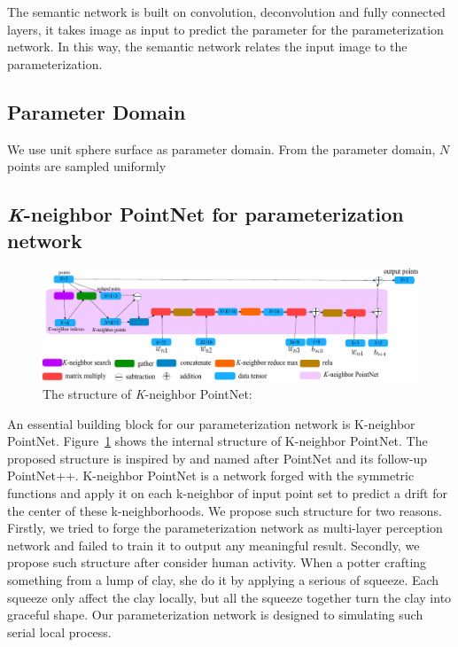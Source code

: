 The semantic network is built on convolution, deconvolution and fully connected layers, it takes image as input to predict the parameter for the parameterization network. In this way, the semantic network relates the input image to the parameterization.
\subsection{Parameter Domain}
We use unit sphere surface as parameter domain. From the parameter domain, $N$ points are sampled uniformly 
\subsection{\textit{K}-neighbor PointNet for parameterization network} 
\label{subsec:k-n_point_net}
\begin{figure}[htbp]
	\centering
	\includegraphics[width=\linewidth]{img/net/k-n_pointnet}
	\caption{The structure of \textit{K}-neighbor PointNet: }
	\label{fig:knpointnet}
\end{figure}
An essential building block for our parameterization network is K-neighbor PointNet. Figure~\ref{fig:knpointnet} shows the internal structure of K-neighbor PointNet. The proposed structure is inspired by and named after PointNet\citep{PointNet} and its follow-up PointNet++\citep{NIPS2017_7095}. K-neighbor PointNet is a network forged with the symmetric functions and apply it on each k-neighbor of input point set to predict a drift for the center of these k-neighborhoods. We propose such structure for two reasons. Firstly, we tried to forge the parameterization network as multi-layer perception network and failed to train it to output any meaningful result. Secondly, we propose such structure after consider human activity. When a potter crafting something from a lump of clay, she do it by applying a serious of squeeze. Each squeeze only affect the clay locally, but all the squeeze together turn the clay into graceful shape. Our parameterization network is designed to simulating such serial local process. 
